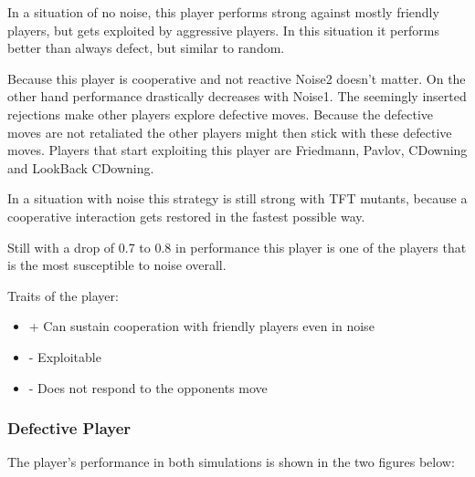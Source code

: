 \documentclass[11pt,twoside]{article}
\begin{document}
In a situation of no noise, this player performs strong against mostly friendly players, but gets exploited by aggressive players. In this situation it performs better than always defect, but similar to random.

Because this player is cooperative and not reactive Noise2 doesn't matter. On the other hand performance drastically decreases with Noise1. The seemingly inserted rejections make other players explore defective moves. Because the defective moves are not retaliated the other players might then stick with these defective moves. Players that start exploiting this player are Friedmann, Pavlov, CDowning and LookBack CDowning.

In a situation with noise this strategy is still strong with TFT mutants, because a cooperative interaction gets restored in the fastest possible way.

Still with a drop of 0.7 to 0.8 in performance this player is one of the players that is the most susceptible to noise overall.

Traits of the player:

\renewcommand{\labelitemi}{}

\begin{itemize}
	\item + Can sustain cooperation with friendly players even in noise
	\item - Exploitable
	\item - Does not respond to the opponents move
\end{itemize}
\renewcommand{\labelitemi}{$\bullet$}

\newpage
\subsubsection{Defective Player}

The player's performance in both simulations is shown in the two figures below:
\end{document}
